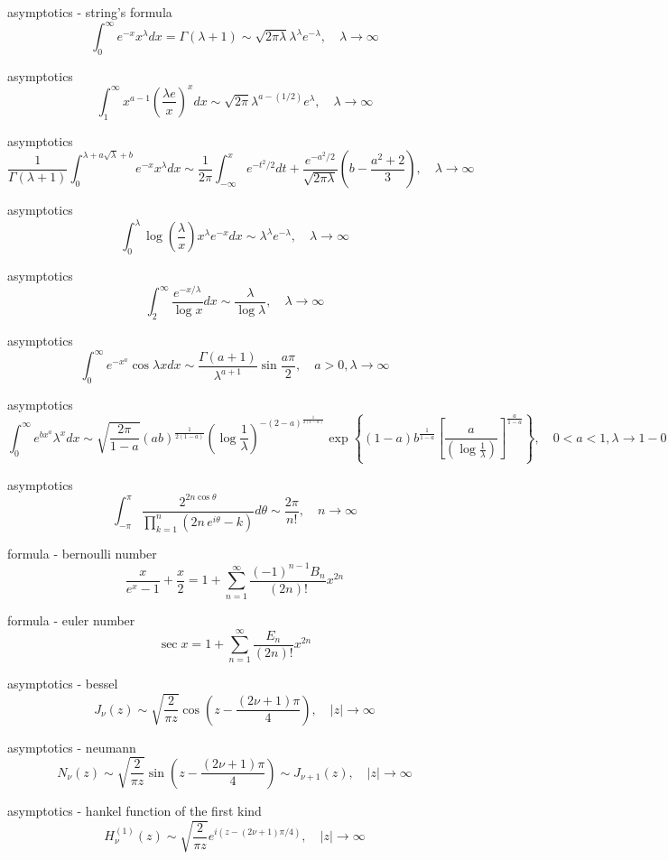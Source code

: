 asymptotics - string’s formula
$$
\int^\infty_0 e^{-x}x^\lambda dx=\Gamma(\lambda+1) \sim \sqrt{2\pi\lambda}\lambda^\lambda e^{-\lambda},\quad \lambda\rightarrow\infty
$$

asymptotics
$$
\int^\infty_1 x^{a-1}\left(\frac{\lambda e}{x}\right)^x dx \sim \sqrt{2\pi}\lambda^{a-(1/2)}e^\lambda, \quad \lambda\rightarrow\infty
$$

asymptotics
$$
\frac{1}{\Gamma(\lambda+1)}\int^{\lambda+a\sqrt{\lambda}+b}_0 e^{-x}x^\lambda dx \sim \frac{1}{2\pi}\int^x_{-\infty}e^{-t^2/2}dt+\frac{e^{-a^2/2}}{\sqrt{2\pi \lambda}}\left(b-\frac{a^2+2}{3}\right), \quad \lambda \rightarrow \infty
$$

asymptotics
$$
\int^\lambda_0 \log\left(\frac{\lambda}{x}\right)x^\lambda e^{-x} dx \sim \lambda^\lambda e^{-\lambda},\quad \lambda\rightarrow\infty
$$

asymptotics
$$
\int^\infty_2 \frac{e^{-x/\lambda}}{\log x}dx \sim \frac{\lambda}{\log \lambda}, \quad \lambda \rightarrow \infty
$$

asymptotics
$$
\int^\infty_0 e^{-x^a}\cos \lambda x dx \sim \frac{\Gamma(a+1)}{\lambda^{a+1}}\sin \frac{a\pi}{2}, \quad a>0,\lambda\rightarrow\infty
$$

asymptotics
$$
\int^\infty_0 e^{b x^a}\lambda^x dx \sim \sqrt{\frac{2\pi}{1-a}}(ab)^{\frac{1}{2(1-a)}}\left(\log\frac{1}{\lambda}\right)^{-(2-a)^{\frac{1}{2(1-a)}}}\exp\left\{(1-a)b^{\frac{1}{1-a}}\left[\frac{a}{\left(\log\frac{1}{\lambda}\right)}\right]^{\frac{a}{1-a}}\right\}, \quad 0<a<1,\lambda\rightarrow 1-0
$$

asymptotics
$$
\int^\pi_{-\pi}\frac{2^{2n \cos\theta}}{\displaystyle\prod^n_{k=1}(2n\, e^{i\theta}-k)}d\theta \sim \frac{2\pi}{n!},\quad n\rightarrow\infty
$$

formula - bernoulli number
$$
\frac{x}{e^x-1}+\frac{x}{2}=1+\sum^\infty_{n=1}\frac{(-1)^{n-1}B_n}{(2n)!}x^{2n}
$$

formula - euler number
$$
\sec x=1+\sum^\infty_{n=1}\frac{E_n}{(2n)!}x^{2n}
$$

asymptotics - bessel
$$
J_\nu(z) \sim \sqrt{\frac{2}{\pi z}}\cos\left(z-\frac{(2\nu+1)\pi}{4}\right), \quad |z|\rightarrow \infty
$$

asymptotics - neumann
$$
N_\nu(z) \sim \sqrt{\frac{2}{\pi z}}\sin\left(z-\frac{(2\nu+1)\pi}{4}\right)\sim J_{\nu+1}(z), \quad |z|\rightarrow \infty
$$

asymptotics - hankel function of the first kind
$$
H^{(1)}_\nu(z) \sim \sqrt{\frac{2}{\pi z}}e^{i(z-(2\nu+1)\pi/4)}, \quad |z|\rightarrow\infty
$$

